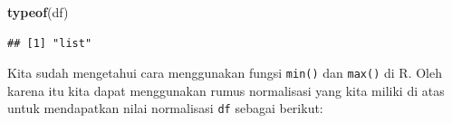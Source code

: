 \documentclass[
]{book}
\newenvironment{Shaded}{\begin{snugshade}}{\end{snugshade}}
\newcommand{\AttributeTok}[1]{\textcolor[rgb]{0.13,0.29,0.53}{#1}}
\newcommand{\FunctionTok}[1]{\textcolor[rgb]{0.13,0.29,0.53}{\textbf{#1}}}
\newcommand{\NormalTok}[1]{#1}
\newcommand{\OtherTok}[1]{\textcolor[rgb]{0.56,0.35,0.01}{#1}}
\newcommand{\SpecialCharTok}[1]{\textcolor[rgb]{0.81,0.36,0.00}{\textbf{#1}}}
\begin{document}
\begin{Shaded}
\begin{Highlighting}[]
\FunctionTok{typeof}\NormalTok{(df)}
\end{Highlighting}
\end{Shaded}

\begin{verbatim}
## [1] "list"
\end{verbatim}

Kita sudah mengetahui cara menggunakan fungsi \texttt{min()} dan \texttt{max()} di R. Oleh karena itu kita dapat menggunakan rumus normalisasi yang kita miliki di atas untuk mendapatkan nilai normalisasi \texttt{df} sebagai berikut:

\begin{Shaded}
\end{Shaded}
\end{document}
